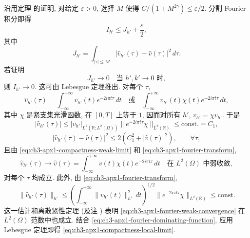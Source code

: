 \hypertarget{chapter-03-page-267}{}
沿用定理  的证明, 对给定 $\varepsilon>0$, 选择 $M$ 使得 $C/(1+M^{2\gamma})\leq\varepsilon/2$. 分割 Fourier 积分即得
\begin{equation}
I_{h'}\leq J_{h'}+\frac\varepsilon2,
\label{eq:ch3-apx1-compactness-tail}
\end{equation}
其中
\begin{equation}
J_{h'}=\int_{|\tau|\leq M}|\widehat v_{h'}(\tau)-\widehat v(\tau)|^2\,d\tau.
\label{eq:ch3-apx1-compactness-local-integral}
\end{equation}
若证明
\begin{equation}
J_{h'}\to0\quad\text{当 $h',k'\to0$ 时},
\label{eq:ch3-apx1-compactness-local-limit}
\end{equation}
则 $I_{h'}\to0$. 这可由 Lebesgue 定理推出. 对每个 $\tau$,
\begin{equation}
\widehat v_{h'}(\tau)=\int_{-\infty}^{+\infty}v_{h'}(t)e^{-2i\pi t\tau}\,dt
\quad\text{或}\quad
\int_{-\infty}^{+\infty}v_{h'}(t)\chi(t)e^{-2i\pi t\tau}\,dt,
\label{eq:ch3-apx1-fourier-transform}
\end{equation}
其中 $\chi$ 是紧支集光滑函数, 在 $[0,T]$ 上等于 $1$, 因而对所有 $h'$, $v_{h'}=\chi v_{h'}$. 于是
\begin{equation}
|\widehat v_{h'}(\tau)|\leq
|v_{h'}|_{L^2(\mathbb R;L^2(\Omega))}\lVert e^{-2i\pi t\tau}\chi\rVert_{L^2(\mathbb R)}
\leq\mathrm{const.}=C_1,
\label{eq:ch3-apx1-fourier-uniform-bound}
\end{equation}
\begin{equation}
|\widehat v_{h'}(\tau)-\widehat v(\tau)|^2
\leq2(C_1^2+|\widehat v(\tau)|^2),
\qquad\forall\tau,
\label{eq:ch3-apx1-fourier-dominating-function}
\end{equation}
且由 \eqref{eq:ch3-apx1-compactness-weak-limit} 和 \eqref{eq:ch3-apx1-fourier-transform},
\begin{equation}
\widehat v_{h'}(\tau)\to\widehat v(\tau)
=\int_{-\infty}^{+\infty}v(t)\chi(t)e^{-2i\pi t\tau}\,dt
\quad\text{在 $L^2(\Omega)$ 中弱收敛},
\label{eq:ch3-apx1-fourier-weak-convergence}
\end{equation}
对每个 $\tau$ 均成立. 此外, 由 \eqref{eq:ch3-apx1-fourier-transform},
\[
\lVert\widehat v_{h'}(\tau)\rVert_{h'}
\leq\left(\int_{-\infty}^{+\infty}\lVert v_{h'}(t)\rVert_{h'}^2\,dt\right)^{1/2}
\lVert e^{-2i\pi t\tau}\chi\rVert_{L^2(\mathbb R)}\leq\mathrm{const.}
\]
这一估计和离散紧性定理  (及注 ) 表明 \eqref{eq:ch3-apx1-fourier-weak-convergence} 在 $L^2(\Omega)$ 范数中也成立. 结合 \eqref{eq:ch3-apx1-fourier-dominating-function}, 应用 Lebesgue 定理即得 \eqref{eq:ch3-apx1-compactness-local-limit}.

